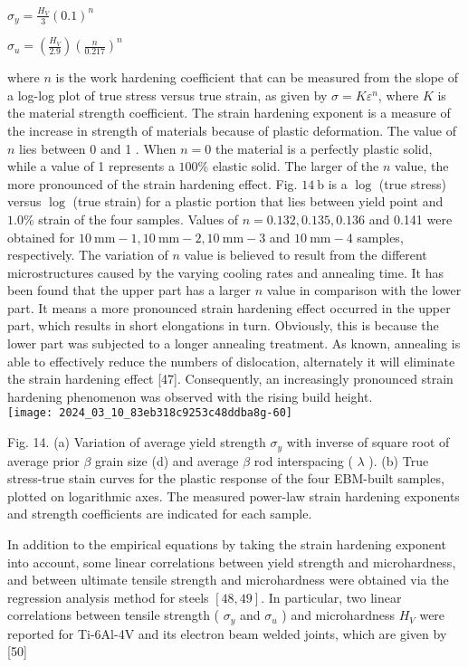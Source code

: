 \documentclass[10pt]{article}
\begin{document}
$\sigma_{y}=\frac{H_{V}}{3}(0.1)^{n}$

$\sigma_{u}=\left(\frac{H_{V}}{2.9}\right)\left(\frac{n}{0.217}\right)^{n}$

where $n$ is the work hardening coefficient that can be measured from the slope of a log-log plot of true stress versus true strain, as given by $\sigma=K \varepsilon^{n}$, where $K$ is the material strength coefficient. The strain hardening exponent is a measure of the increase in strength of materials because of plastic deformation. The value of $n$ lies between 0 and 1 . When $n=0$ the material is a perfectly plastic solid, while a value of 1 represents a $100 \%$ elastic solid. The larger of the $n$ value, the more pronounced of the strain hardening effect. Fig. $14 \mathrm{~b}$ is a $\log$ (true stress) versus $\log$ (true strain) for a plastic portion that lies between yield point and $1.0 \%$ strain of the four samples. Values of $n=0.132,0.135,0.136$ and 0.141 were obtained for $10 \mathrm{~mm}-1,10 \mathrm{~mm}-2,10 \mathrm{~mm}-3$ and $10 \mathrm{~mm}-4$ samples, respectively. The variation of $n$ value is believed to result from the different microstructures caused by the varying cooling rates and annealing time. It has been found that the upper part has a larger $n$ value in comparison with the lower part. It means a more pronounced strain hardening effect occurred in the upper part, which results in short elongations in turn. Obviously, this is because the lower part was subjected to a longer annealing treatment. As known, annealing is able to effectively reduce the numbers of dislocation, alternately it will eliminate the strain hardening effect [47]. Consequently, an increasingly pronounced strain hardening phenomenon was observed with the rising build height.\\
\texttt{[image: 2024\_03\_10\_83eb318c9253c48ddba8g-60]}

Fig. 14. (a) Variation of average yield strength $\sigma_{y}$ with inverse of square root of average prior $\beta$ grain size (d) and average $\beta$ rod interspacing ( $\lambda$ ). (b) True stress-true stain curves for the plastic response of the four EBM-built samples, plotted on logarithmic axes. The measured power-law strain hardening exponents and strength coefficients are indicated for each sample.

In addition to the empirical equations by taking the strain hardening exponent into account, some linear correlations between yield strength and microhardness, and between ultimate tensile strength and microhardness were obtained via the regression analysis method for steels $[48,49]$. In particular, two linear correlations between tensile strength ( $\sigma_{y}$ and $\sigma_{u}$ ) and microhardness $H_{V}$ were reported for Ti-6Al-4V and its electron beam welded joints, which are given by [50]
\end{document}
